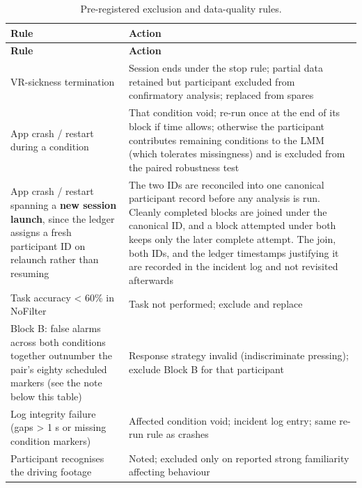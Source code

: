 \begin{longtable}{p{}|p{}}
\caption{Pre-registered exclusion and data-quality rules.}\\
\hline
\textbf{Rule} & \textbf{Action} \\
\hline
\endfirsthead
\hline
\textbf{Rule} & \textbf{Action} \\
\hline
\endhead
\hline
VR-sickness termination & Session ends under the stop rule; partial data retained but participant excluded from confirmatory analysis; replaced from spares \\
App crash / restart during a condition & That condition void; re-run once at the end of its block if time allows; otherwise the participant contributes remaining conditions to the LMM (which tolerates missingness) and is excluded from the paired robustness test \\
App crash / restart spanning a \textbf{new session launch}, since the ledger assigns a fresh participant ID on relaunch rather than resuming & The two IDs are reconciled into one canonical participant record before any analysis is run. Cleanly completed blocks are joined under the canonical ID, and a block attempted under both keeps only the later complete attempt. The join, both IDs, and the ledger timestamps justifying it are recorded in the incident log and not revisited afterwards \\
Task accuracy < 60\% in NoFilter & Task not performed; exclude and replace \\
Block B: false alarms across both conditions together outnumber the pair's eighty scheduled markers (see the note below this table) & Response strategy invalid (indiscriminate pressing); exclude Block B for that participant \\
Log integrity failure (gaps > 1 s or missing condition markers) & Affected condition void; incident log entry; same re-run rule as crashes \\
Participant recognises the driving footage & Noted; excluded only on reported strong familiarity affecting behaviour \\
\hline
\end{longtable}


